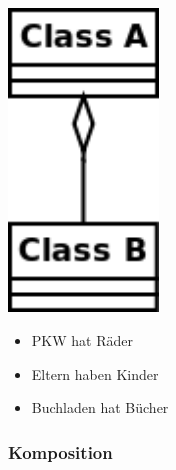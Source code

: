 \documentclass[11pt, a4paper]{article}
\begin{document}
\begin{minipage}[h]{0.3\textwidth}
    \raggedleft \includegraphics[width=0.3\textwidth]{Klassen-Elemente/3.png} 
\end{minipage}
\begin{minipage}[h]{0.65\textwidth}
    \begin{itemize}
        \item PKW hat Räder
        \item Eltern haben Kinder
        \item Buchladen hat Bücher
    \end{itemize}
\end{minipage}

\vspace{1em}

\raggedright \subsubsection{Komposition}

\vspace{1em}
\end{document}
